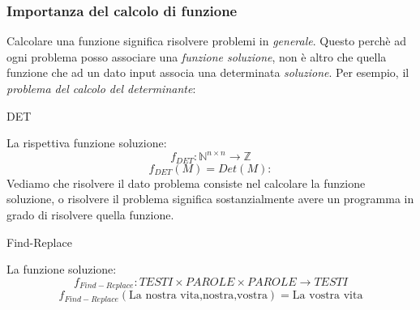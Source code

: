 \documentclass{article}
\begin{document}
\subsubsection{Importanza del calcolo di funzione}
Calcolare una funzione significa risolvere problemi in \textit{generale}. Questo
perchè ad ogni problema posso associare una \textit{funzione soluzione}, non è altro che
quella funzione che ad un dato input associa una determinata \textit{soluzione}.
Per esempio, il \textit{problema del calcolo del determinante}:
\begin{algorithm}[hbt!]
    \caption{DET}\label{alg:det}
\end{algorithm}
La rispettiva funzione soluzione:
$$f_{DET}:\mathbb{N}^{n\times n}\rightarrow \mathbb{Z}$$
$$f_{DET}(M)=Det(M):$$
Vediamo che risolvere il dato problema consiste nel calcolare la funzione soluzione,
o risolvere il problema significa sostanzialmente avere un programma in grado
di risolvere quella funzione.
\begin{algorithm}[hbt!]
    \caption{Find-Replace}\label{alg:find-replace}
\end{algorithm}
La funzione soluzione:
$$f_{Find-Replace}:TESTI\times PAROLE\times PAROLE\rightarrow TESTI$$
$$f_{Find-Replace}(\text{La nostra vita,nostra,vostra})=\text{La vostra vita}$$
\end{document}
